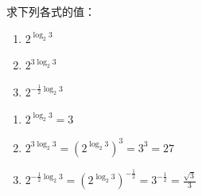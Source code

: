 \begin{example}
    求下列各式的值：
    \begin{multicols}{3}
\begin{enumerate}[(1)]
    \item $2^{\log_2 3}$
    \item $2^{3\log_2 3}$
    \item $2^{-\tfrac{1}{2}\log_2 3}$
\end{enumerate}
\end{multicols}
\end{example}
 
\begin{solution}
\begin{enumerate}[(1)]
    \item $2^{\log_2 3}=3$
    \item $2^{3\log_2 3}=\left(2^{\log_2 3}\right)^3=3^3=27$
    \item $2^{-\tfrac{1}{2}\log_2 3}=\left(2^{\log_2 3}\right)^{-\tfrac{1}{2}}=3^{-\tfrac{1}{2}}=\frac{\sqrt{3}}{3}$
\end{enumerate}
\end{solution}    

